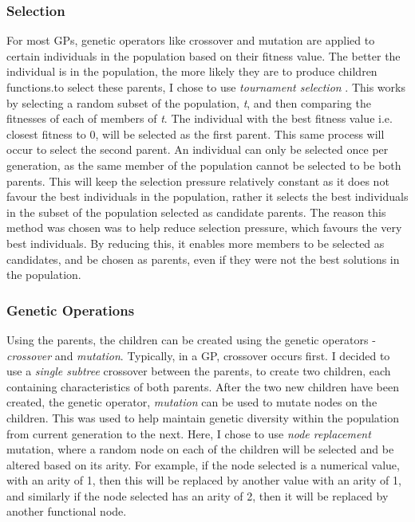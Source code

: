 \documentclass[11pt]{article}
\begin{document}
\subsubsection{Selection}
For most GPs, genetic operators like crossover and mutation are applied to certain individuals in the population based on their fitness value. The better the individual is in the population, the more likely they are to produce children functions.to select these parents, I chose to use \textit{tournament selection} \cite{?}. This works by selecting a random subset of the population, \textit{t}, and then comparing the fitnesses of each of members of \textit{t}. The individual with the best fitness value i.e. closest fitness to 0, will be selected as the first parent. This same process will occur to select the second parent. An individual can only be selected once per generation, as the same member of the population cannot be selected to be both parents. This will keep the selection pressure relatively constant as it does not favour the best individuals in the population, rather it selects the best individuals in the subset of the population selected as candidate parents. The reason this method was chosen was to help reduce selection pressure, which favours the very best individuals. By reducing this, it enables more members to be selected as candidates, and be chosen as parents, even if they were not the best solutions in the population. 
\subsubsection{Genetic Operations}
Using the parents, the children can be created using the genetic operators - \textit{crossover} and \textit{mutation}. Typically, in a GP, crossover occurs first. I decided to use a \textit{single subtree} crossover between the parents, to create two children, each containing characteristics of both parents.
After the two new children have been created, the genetic operator,  \textit{mutation} can be used to mutate nodes on the children. This was used to help maintain genetic diversity within the population from current generation to the next.  Here, I chose to use \textit{node replacement} mutation, where a random node on each of the children will be selected and be altered based on its arity. For example, if the node selected is a numerical value, with an arity of 1, then this will be replaced by another value with an arity of 1, and similarly if the node selected has an arity of 2, then it will be replaced by another functional node.
\end{document}
